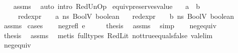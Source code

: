 \begin{isabellebody}
%
\isadelimproof
\ \ %
\endisadelimproof
%
\isatagproof
{}\isamarkupfalse%
\ assms\ \isamarkupfalse%
\ {\isacharparenleft}{\kern0pt}auto\ intro{\isacharcolon}{\kern0pt}\ RedUnOp{\isacharparenright}{\kern0pt}%
\endisatagproof
{\isafoldproof}%
%
\isadelimproof
\isanewline
%
\endisadelimproof
\isanewline
{}\isamarkupfalse%
\ equiv{\isacharunderscore}{\kern0pt}preserves{\isacharunderscore}{\kern0pt}value{\isacharcolon}{\kern0pt}\isanewline
\ \ \ {\isachardoublequoteopen}a\ {\isasymsim}\ b{\isachardoublequoteclose}\isanewline
\ \ \ \ \ {\isachardoublequoteopen}red{\isacharunderscore}{\kern0pt}expr\ {\isasymLambda}\ {\isasymGamma}\ {\isasymOmega}\ a\ ns\ {\isacharparenleft}{\kern0pt}BoolV\ boolean{\isacharparenright}{\kern0pt}{\isachardoublequoteclose}\isanewline
\ \ \ {\isachardoublequoteopen}red{\isacharunderscore}{\kern0pt}expr\ {\isasymLambda}\ {\isasymGamma}\ {\isasymOmega}\ b\ ns\ {\isacharparenleft}{\kern0pt}BoolV\ boolean{\isacharparenright}{\kern0pt}{\isachardoublequoteclose}\isanewline
%
\isadelimproof
\ \ %
\endisadelimproof
%
\isatagproof
{}\isamarkupfalse%
\ assms\isanewline
{}\isamarkupfalse%
\ cases\isanewline
\ \ \isamarkupfalse%
\ {\isacharparenleft}{\kern0pt}neg{\isacharunderscore}{\kern0pt}refl\ e{}{\isacharparenright}{\kern0pt}\isanewline
\ \ \isamarkupfalse%
\ \isamarkupfalse%
\ {\isacharquery}{\kern0pt}thesis\ \isamarkupfalse%
\ assms\ \isamarkupfalse%
\ simp\isanewline
{}\isamarkupfalse%
\isanewline
\ \ \isamarkupfalse%
\ neg{\isacharunderscore}{\kern0pt}equiv{}\isanewline
\ \ \isamarkupfalse%
\ \isamarkupfalse%
\ {\isacharquery}{\kern0pt}thesis\ \isamarkupfalse%
\ assms\ \isamarkupfalse%
\ {\isacharparenleft}{\kern0pt}metis\ {\isacharparenleft}{\kern0pt}full{\isacharunderscore}{\kern0pt}types{\isacharparenright}{\kern0pt}\ RedLit\ not{\isacharunderscore}{\kern0pt}true{\isacharunderscore}{\kern0pt}equals{\isacharunderscore}{\kern0pt}false\ val{\isacharunderscore}{\kern0pt}elim{\isacharparenright}{\kern0pt}\isanewline
{}\isamarkupfalse%
\isanewline
\ \ \isamarkupfalse%
\ neg{\isacharunderscore}{\kern0pt}equiv{}\isanewline
\ \ \isamarkupfalse%
\ \isamarkupfalse%

\end{isabellebody}
